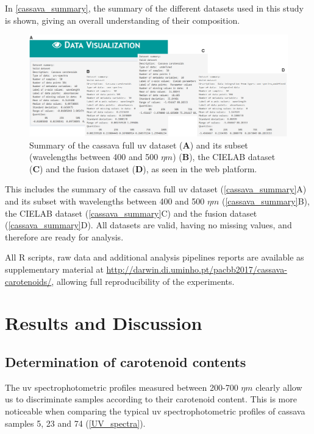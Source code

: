 In \autoref{cassava_summary}, the summary of the different datasets used in this study is shown, giving an overall understanding of their composition. 

\begin{figure}[H]
	\centering
	\includegraphics[width=1\linewidth]{Imagens/Case_study/summary_subset_full}
	\caption{Summary of the cassava full \gls{uv} dataset (\textbf{A}) and its subset (wavelengths between 400 and 500 $\eta m$) (\textbf{B}), the CIELAB dataset (\textbf{C}) and the fusion dataset (\textbf{D}), as seen in the web platform.}
	\label{cassava_summary}
\end{figure}

This includes the summary of the cassava full \gls{uv} dataset (\autoref{cassava_summary}A) and its subset with wavelengths between 400 and 500 $\eta m$ (\autoref{cassava_summary}B), the CIELAB dataset (\autoref{cassava_summary}C) and the fusion dataset (\autoref{cassava_summary}D). All datasets are valid, having no missing values, and therefore are ready for analysis.

All R scripts, raw data and additional analysis pipelines reports are available as supplementary material at \href{http://darwin.di.uminho.pt/pacbb2017/cassava-carotenoids/}{http://darwin.di.uminho.pt/pacbb2017/cassava-carotenoids/}, allowing full reproducibility of the experiments.


\section{Results and Discussion}  \label{results}

\subsection{Determination of carotenoid contents} \label{color_content_subsec}

The \gls{uv} spectrophotometric profiles measured between 200-700 $\eta m$ clearly allow us to discriminate samples according to their carotenoid content. This is more noticeable when comparing the typical \gls{uv} spectrophotometric profiles of cassava samples 5, 23 and 74 (\autoref{UV_spectra}). 


